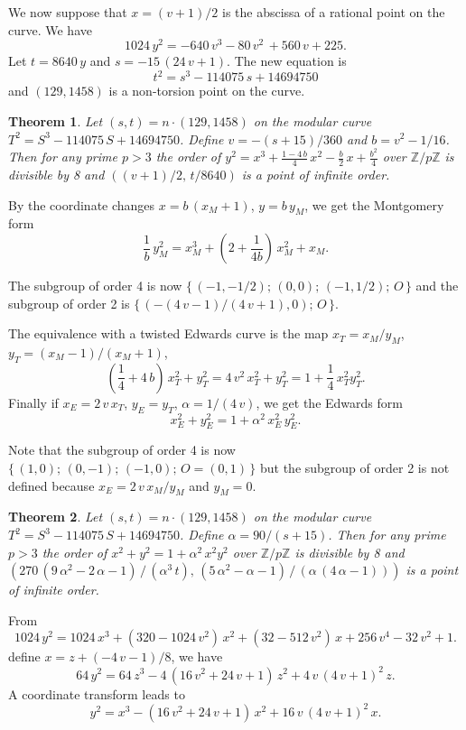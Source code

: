 \documentclass[a4paper, 11pt, pdftex]{report}
\theoremstyle{plain}
\newtheorem{theorem}{Theorem}[chapter]
\theoremstyle{definition}
\begin{document}
We now suppose that $x = (v + 1) / 2$ is the abscissa of a rational point on the curve.
We have $$1024\, y^2 = -640\, v^3 - 80\, v^2\, + 560\,v + 225.$$
Let $t = 8640\,y$ and $s = -15\,(24\,v + 1)$. The new equation is
$$t^2 = s^3 - 114075\,s + 14694750$$
and $(129, 1458)$ is a non-torsion point on the curve.

\begin{theorem}
Let $(s, t) = n\cdot (129, 1458)$ on the modular curve $T^2 = S^3 - 114075\,S + 14694750$.
Define $v = -(s + 15) / 360$ and $b = v^2 - 1/16$. Then for any prime $p > 3$ the order of
$y^2 = x^3 + \frac{1 - 4\,b}{4}\, x^2 - \frac{b}{2}\, x + \frac{b^2}{4}$
over $\mathbb{Z}/p\mathbb{Z}$ is divisible by 8  and $(\left(v + 1\right) / 2,\, t / 8640)$
is a point of infinite order.
\end{theorem}

By the coordinate changes $x = b\,(x_M + 1)$, $y = b\,y_M$, we get the Montgomery form
$$\frac{1}{b}\,y_M^2 = x_M^3 + (2 + \frac{1}{4b})\,x_M^2 + x_M.$$

The subgroup of order 4 is now $\{\,(-1, -1/2);\, (0, 0);\, (-1, 1/2);\, O\, \}$ and
the subgroup of order 2 is $\{\,(-(4\,v - 1)/(4\,v + 1), 0);\, O\, \}$.

The equivalence with a twisted Edwards curve is the map $x_T = x_M / y_M$,
$y_T = (x_M - 1)/(x_M + 1)$,
$$(\frac{1}{4} + 4\,b)\,x_T^2 + y_T^2 = 4\,v^2\,x_T^2 + y_T^2 = 1 + \frac{1}{4}\,x_T^2y_T^2.$$
Finally if $x_E = 2\,v\,x_T$, $y_E = y_T$, $\alpha = 1 / (4\,v)$, we get the Edwards form
$$x_E^2 + y_E^2 = 1 + \alpha^2\,x_E^2\,y_E^2.$$

Note that the subgroup of order 4 is now $\{\,(1, 0);\, (0, -1);\, (-1, 0);\, O = (0, 1)\, \}$
but the subgroup of order 2 is not defined because $x_E = 2\,v\,x_M / y_M$ and $y_M = 0$.

\begin{theorem}
Let $(s, t) = n\cdot (129, 1458)$ on the modular curve $T^2 = S^3 - 114075\,S + 14694750$.
Define $\alpha = 90 / (s + 15)$. Then for any prime $p > 3$ the order of
$x^2 + y^2 = 1 + \alpha^2\,x^2y^2$ over $\mathbb{Z}/p\mathbb{Z}$ is divisible by 8
and $(270\, (9\,\alpha^2 - 2\,\alpha - 1)\, /\, (\alpha^3\,t),\,
(5\,\alpha^2 - \alpha - 1)\, /\, (\alpha\, (4\,\alpha - 1)))$
is a point of infinite order.
\end{theorem}

\bigskip

From
$$1024\, y^2 = 1024\,x^3 + (320 - 1024\,v^2)\, x^2 + (32 - 512\,v^2)\, x
+ 256\,v^4 - 32\,v^2 + 1.$$
define $x = z + (-4\,v - 1)/8$, we have
$$64\, y^2 = 64\, z^3 - 4\,(16\,v^2 + 24\,v + 1)\, z^2 + 4\,v\,(4\,v + 1)^2\, z.$$
A coordinate transform leads to 
$$y^2 = x^3 - (16\,v^2 + 24\,v + 1)\, x^2 + 16\,v\,(4\,v + 1)^2\, x.$$
\end{document}
